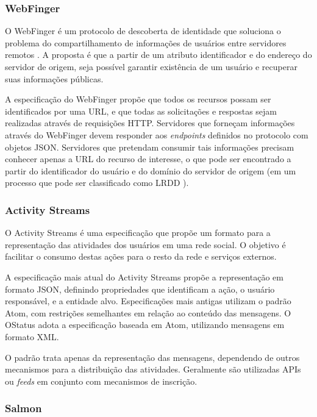\subsubsection{WebFinger}

O WebFinger é um protocolo de descoberta de identidade que soluciona o problema do
compartilhamento de informações de usuários entre servidores remotos \cite{rfc7033}.
A proposta é que a partir de um atributo identificador e do endereço do servidor de
origem, seja possível garantir existência de um usuário e recuperar suas informações
públicas.

A especificação do WebFinger propõe que todos os recursos possam ser identificados
por uma URL, e que todas as solicitações e respostas sejam realizadas através de
requisições HTTP. Servidores que forneçam informações através do WebFinger devem
responder aos \textit{endpoints} definidos no protocolo com objetos JSON. Servidores
que pretendam consumir tais informações precisam conhecer apenas a URL do recurso de
interesse, o que pode ser encontrado a partir do identificador do usuário e do
domínio do servidor de origem (em um processo que pode ser classificado como LRDD
\cite{lrdd2010}). 

\subsubsection{Activity Streams}

O Activity Streams é uma especificação que propõe um formato para a representação
das atividades dos usuários em uma rede social. O objetivo é facilitar o consumo
destas ações para o resto da rede e serviços externos.

A especificação mais atual do Activity Streams propõe a representação em formato
JSON, definindo propriedades que identificam a ação, o usuário responsável, e a
entidade alvo. Especificações mais antigas utilizam o padrão Atom, com restrições
semelhantes em relação ao conteúdo das mensagens. O OStatus adota a especificação
baseada em Atom, utilizando mensagens em formato XML.

O padrão trata apenas da representação das mensagens, dependendo de outros
mecanismos para a distribuição das atividades. Geralmente são utilizadas APIs ou
\textit{feeds} em conjunto com mecanismos de inscrição.

\subsubsection{Salmon}

